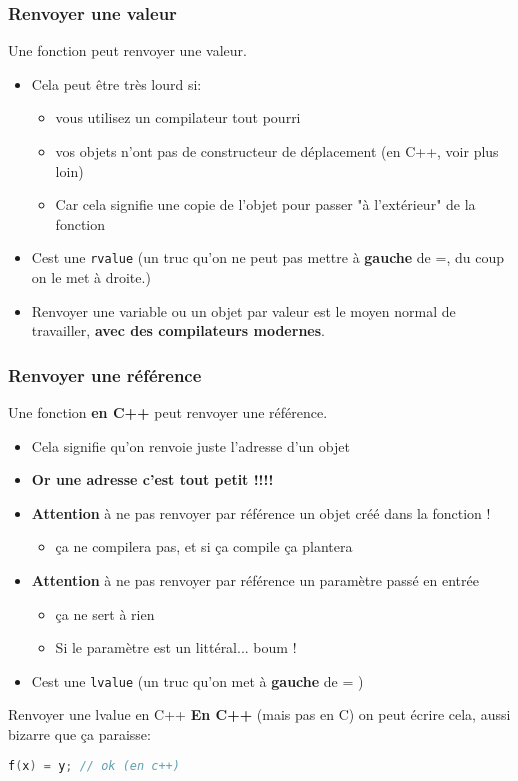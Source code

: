 \documentclass{beamer}
\begin{document}
\begin{frame}[fragile=singleslide,shrink=20]
\frametitle{Renvoyer une valeur}
Une fonction peut renvoyer une valeur.
\begin{itemize}
\item{Cela peut être très lourd si:
\begin{itemize}
\item{vous utilisez un compilateur tout pourri}
\item{vos objets n'ont pas de constructeur de déplacement (en C++, voir plus loin)}
\item{Car cela signifie une copie de l'objet pour passer "à l'extérieur" de la fonction}
\end{itemize}}
\item{Cest une \texttt{rvalue} (un truc qu'on ne peut pas mettre à \textbf{gauche} de =, du coup on le met à droite.) }
\item{Renvoyer une variable ou un objet par valeur est le moyen normal de travailler, \textbf{avec des compilateurs modernes}.}
\end{itemize}

\end{frame}

\begin{frame}[fragile=singleslide,shrink=20]
\frametitle{Renvoyer une référence}
Une fonction \textbf{en C++} peut renvoyer une référence.
\begin{itemize}
\item{Cela signifie qu'on renvoie juste l'adresse d'un objet}
\item{\textbf{Or une adresse c'est tout petit !!!!}}
\item{\textbf{Attention} à ne pas renvoyer par référence un objet créé dans la fonction !}
\begin{itemize}
\item{ça ne compilera pas, et si ça compile ça plantera}
\end{itemize}
\item{\textbf{Attention} à ne pas renvoyer par référence un paramètre passé en entrée}
\begin{itemize}
\item{ça ne sert à rien}
\item{Si le paramètre est un littéral... boum !}
\end{itemize}
\item{Cest une \texttt{lvalue} (un truc qu'on met à \textbf{gauche} de = )}
\end{itemize}

\begin{block}{Renvoyer une lvalue en C++}
\textbf{En C++} (mais pas en C) on peut écrire cela, aussi bizarre que ça paraisse:
\begin{lstlisting}[language=c++]
f(x) = y; // ok (en c++)
\end{lstlisting}
\end{block}
\end{frame}
\end{document}
